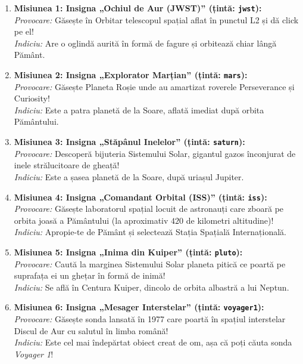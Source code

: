 \begin{tcolorbox}[orbitarquiz, title={\textbf{Cele 6 Misiuni Oficiale și Insigne din Jurnalul de Bord Orbitar}}]
\begin{enumerate}[leftmargin=1.5em, itemsep=4pt]
  \item \textbf{Misiunea 1: Insigna „Ochiul de Aur (JWST)” (țintă: \texttt{jwst}):}\\
  \emph{Provocare:} Găsește în Orbitar telescopul spațial aflat în punctul L2 și dă click pe el!\\
  \emph{Indiciu:} Are o oglindă aurită în formă de fagure și orbitează chiar lângă Pământ.
  \item \textbf{Misiunea 2: Insigna „Explorator Marțian” (țintă: \texttt{mars}):}\\
  \emph{Provocare:} Găsește Planeta Roșie unde au amartizat roverele Perseverance și Curiosity!\\
  \emph{Indiciu:} Este a patra planetă de la Soare, aflată imediat după orbita Pământului.
  \item \textbf{Misiunea 3: Insigna „Stăpânul Inelelor” (țintă: \texttt{saturn}):}\\
  \emph{Provocare:} Descoperă bijuteria Sistemului Solar, gigantul gazos înconjurat de inele strălucitoare de gheață!\\
  \emph{Indiciu:} Este a șasea planetă de la Soare, după uriașul Jupiter.
  \item \textbf{Misiunea 4: Insigna „Comandant Orbital (ISS)” (țintă: \texttt{iss}):}\\
  \emph{Provocare:} Găsește laboratorul spațial locuit de astronauți care zboară pe orbita joasă a Pământului (la aproximativ $420$ de kilometri altitudine)!\\
  \emph{Indiciu:} Apropie-te de Pământ și selectează Stația Spațială Internațională.
  \item \textbf{Misiunea 5: Insigna „Inima din Kuiper” (țintă: \texttt{pluto}):}\\
  \emph{Provocare:} Caută la marginea Sistemului Solar planeta pitică ce poartă pe suprafața ei un ghețar în formă de inimă!\\
  \emph{Indiciu:} Se află în Centura Kuiper, dincolo de orbita albastră a lui Neptun.
  \item \textbf{Misiunea 6: Insigna „Mesager Interstelar” (țintă: \texttt{voyager1}):}\\
  \emph{Provocare:} Găsește sonda lansată în 1977 care poartă în spațiul interstelar Discul de Aur cu salutul în limba română!\\
  \emph{Indiciu:} Este cel mai îndepărtat obiect creat de om, așa că poți căuta sonda \emph{Voyager 1}!
\end{enumerate}
\end{tcolorbox}

